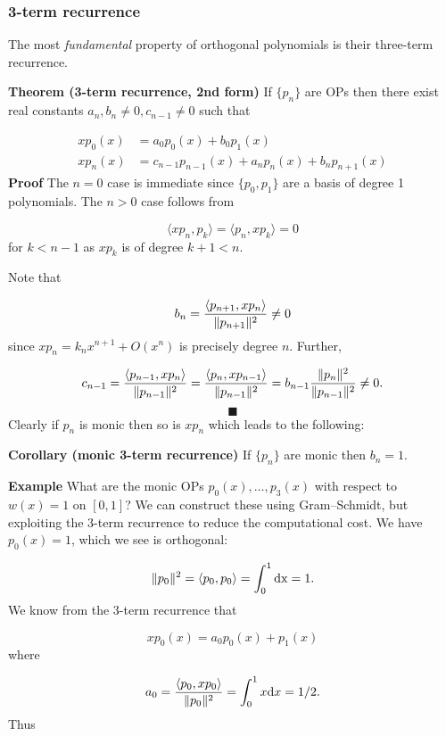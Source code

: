 \documentclass[12pt,a4paper]{article}
\def\endash{–}
\begin{document}
\subsubsection{3-term recurrence}
The most \emph{fundamental} property of orthogonal polynomials is their three-term recurrence.

\textbf{Theorem (3-term recurrence, 2nd form)} If $\{p_n\}$ are OPs then there exist real constants $a_n, b_n \ensuremath{\ne}0,c_{n-1} \ensuremath{\ne}0$ such that


\begin{align*}
x p_0(x) &= a_0 p_0(x) + b_0 p_1(x)  \\
x p_n(x) &= c_{n-1} p_{n-1}(x) + a_n p_n(x) + b_n p_{n+1}(x)
\end{align*}
\textbf{Proof} The $n=0$ case is immediate since $\{p_0,p_1\}$ are a basis of degree 1 polynomials. The $n >0$ case follows from

\[
\ensuremath{\langle}x p_n, p_k\ensuremath{\rangle} = \ensuremath{\langle} p_n, xp_k\ensuremath{\rangle} = 0
\]
for $k < n-1$ as $x p_k$ is of degree $k+1 < n$.

Note that

\[
b_n = {\ensuremath{\langle}p_{n+1}, x p_n\ensuremath{\rangle} \over \|p_{n+1} \|^2} \ensuremath{\ne} 0
\]
since $x p_n = k_n x^{n+1} + O(x^n)$ is precisely degree $n$. Further,

\[
c_{n-1} = {\ensuremath{\langle}p_{n-1}, x p_n\ensuremath{\rangle} \over \|p_{n-1}\|^2 } =
{\ensuremath{\langle}p_n, x p_{n-1}\ensuremath{\rangle}  \over \|p_{n-1}\|^2 } =  b_{n-1}{\|p_n\|^2  \over \|p_{n-1}\|^2 } \ensuremath{\ne} 0.
\]
\[
\blacksquare
\]
Clearly if $p_n$ is monic then so is $x p_n$ which leads to the following:

\textbf{Corollary (monic 3-term recurrence)} If $\{p_n\}$ are monic then $b_n =  1$.

\textbf{Example} What are the  monic OPs $p_0(x),\ensuremath{\ldots},p_3(x)$ with respect to $w(x) = 1$ on $[0,1]$? We can construct these using Gram\ensuremath{\endash}Schmidt, but exploiting the 3-term recurrence to reduce the computational cost. We have $p_0(x) = 1$, which we see is orthogonal:

\[
\|p_0\|^2 = \ensuremath{\langle}p_0,p_0\ensuremath{\rangle} = \ensuremath{\int}_0^1 {\rm d x} = 1.
\]
We know from the 3-term recurrence that

\[
x p_0(x) = a_0 p_0(x) +  p_1(x)
\]
where

\[
a_0 = {\ensuremath{\langle}p_0,x p_0\ensuremath{\rangle}  \over \|p_0\|^2} = \ensuremath{\int}_0^1 x {\rm d} x = 1/2.
\]
Thus
\end{document}
